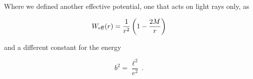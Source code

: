 Where we defined another effective potential, one that acts on light rays only,
as

\begin{equation}
    W_{\rm eff} (r) = \frac{1}{r^2} \left( 1 - \frac{2M}{r} \right)
    \label{cap1:eq:W}
\end{equation}

and a different constant for the energy

\begin{equation}
    b^2 = \frac{\ell^2}{e^2} \, .
    \label{cap1:eq:b}
\end{equation}

